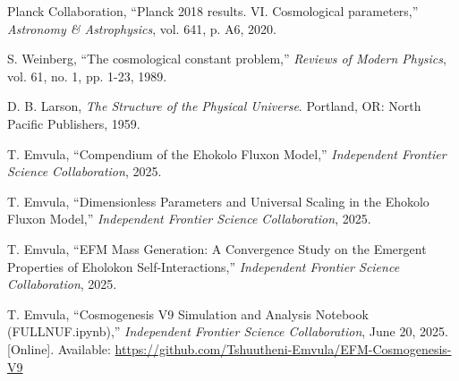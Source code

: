 \documentclass[11pt, twoside]{article}
\begin{document}

\begin{thebibliography}{9}
\raggedright

Planck Collaboration, ``Planck 2018 results. VI. Cosmological parameters,'' \textit{Astronomy \& Astrophysics}, vol. 641, p. A6, 2020.

S. Weinberg, ``The cosmological constant problem,'' \textit{Reviews of Modern Physics}, vol. 61, no. 1, pp. 1-23, 1989.

D. B. Larson, \textit{The Structure of the Physical Universe}. Portland, OR: North Pacific Publishers, 1959.

T. Emvula, ``Compendium of the Ehokolo Fluxon Model,'' \textit{Independent Frontier Science Collaboration}, 2025.

T. Emvula, ``Dimensionless Parameters and Universal Scaling in the Ehokolo Fluxon Model,'' \textit{Independent Frontier Science Collaboration}, 2025.

T. Emvula, ``EFM Mass Generation: A Convergence Study on the Emergent Properties of Eholokon Self-Interactions,'' \textit{Independent Frontier Science Collaboration}, 2025.

T. Emvula, ``Cosmogenesis V9 Simulation and Analysis Notebook (FULLNUF.ipynb),'' \textit{Independent Frontier Science Collaboration}, June 20, 2025. [Online]. Available: \url{https://github.com/Tshuutheni-Emvula/EFM-Cosmogenesis-V9}

\end{thebibliography}
\end{document}
